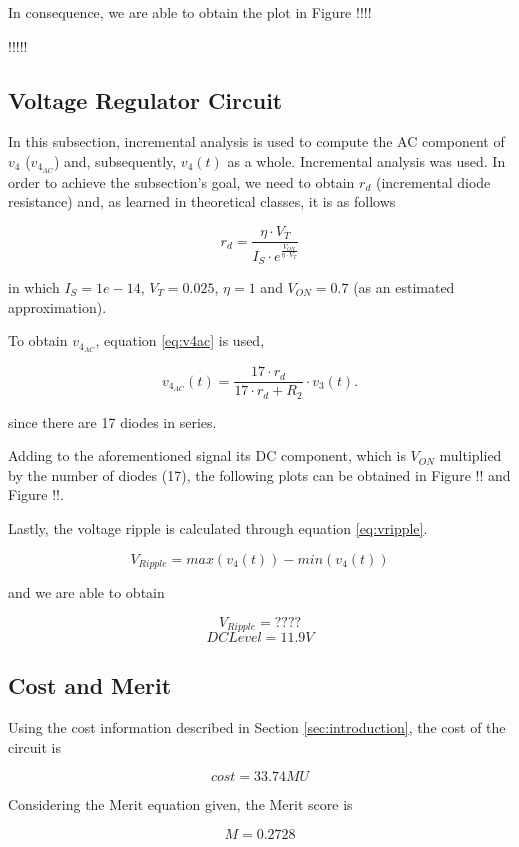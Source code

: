 In consequence, we are able to obtain the plot in Figure !!!!

!!!!!

\subsection{Voltage Regulator Circuit}
\label{subsec:theo_vr}

In this subsection, incremental analysis is used to compute the AC component of $v_4$ ($v_{4_{AC}}$) and, subsequently, $v_4(t)$ as a whole. Incremental analysis was used. In order to achieve the subsection's goal, we need to obtain $r_d$ (incremental diode resistance) and, as learned in theoretical classes, it is as follows

\begin{equation}
    r_d = \frac{\eta \cdot V_T}{I_S \cdot e^{\frac{V_{ON}}{\eta \cdot V_T}}}
    \label{eq:rd}
\end{equation}

in which $I_S=1e-14$, $V_T=0.025$, $\eta = 1$ and $V_{ON}=0.7$ (as an estimated approximation).

To obtain $v_{4_{AC}}$, equation \ref{eq:v4ac} is used,

\begin{equation}
    v_{4_{AC}}(t) = \frac{17 \cdot r_d}{17 \cdot r_d + R_2} \cdot v_3(t).
    \label{eq:v4ac}
\end{equation}

since there are 17 diodes in series.

Adding to the aforementioned signal its DC component, which is $V_{ON}$ multiplied by the number of diodes (17), the following plots can be obtained in Figure !! and Figure !!.

Lastly, the voltage ripple is calculated through equation \ref{eq:vripple}.

\begin{equation}
    V_{Ripple} = max(v_4(t)) - min(v_4(t))
    \label{eq:vripple}
\end{equation}

and we are able to obtain 

\begin{equation}
    V_{Ripple} = ????
\end{equation}
\begin{equation}
    DC Level = 11.9 V
\end{equation}

\subsection{Cost and Merit}
\label{subsec:theo_merit}

Using the cost information described in Section \ref{sec:introduction}, the cost of the circuit is

\begin{equation}
    cost = 33.74 MU
\end{equation}

Considering the Merit equation given, the Merit score is

\begin{equation}
    M = 0.2728
\end{equation}